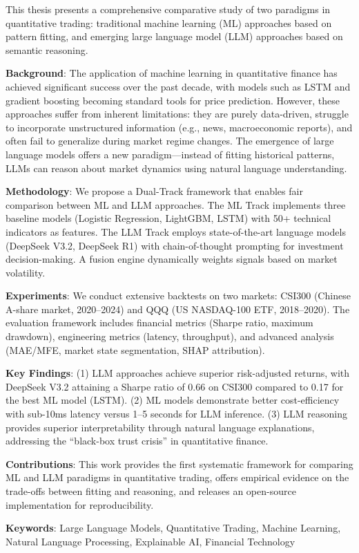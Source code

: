 
This thesis presents a comprehensive comparative study of two paradigms in quantitative trading: traditional machine learning (ML) approaches based on pattern fitting, and emerging large language model (LLM) approaches based on semantic reasoning.

\textbf{Background}: The application of machine learning in quantitative finance has achieved significant success over the past decade, with models such as LSTM and gradient boosting becoming standard tools for price prediction. However, these approaches suffer from inherent limitations: they are purely data-driven, struggle to incorporate unstructured information (e.g., news, macroeconomic reports), and often fail to generalize during market regime changes. The emergence of large language models offers a new paradigm---instead of fitting historical patterns, LLMs can reason about market dynamics using natural language understanding.

\textbf{Methodology}: We propose a Dual-Track framework that enables fair comparison between ML and LLM approaches. The ML Track implements three baseline models (Logistic Regression, LightGBM, LSTM) with 50+ technical indicators as features. The LLM Track employs state-of-the-art language models (DeepSeek V3.2, DeepSeek R1) with chain-of-thought prompting for investment decision-making. A fusion engine dynamically weights signals based on market volatility.

\textbf{Experiments}: We conduct extensive backtests on two markets: CSI300 (Chinese A-share market, 2020--2024) and QQQ (US NASDAQ-100 ETF, 2018--2020). The evaluation framework includes financial metrics (Sharpe ratio, maximum drawdown), engineering metrics (latency, throughput), and advanced analysis (MAE/MFE, market state segmentation, SHAP attribution).

\textbf{Key Findings}: (1) LLM approaches achieve superior risk-adjusted returns, with DeepSeek V3.2 attaining a Sharpe ratio of 0.66 on CSI300 compared to 0.17 for the best ML model (LSTM). (2) ML models demonstrate better cost-efficiency with sub-10ms latency versus 1--5 seconds for LLM inference. (3) LLM reasoning provides superior interpretability through natural language explanations, addressing the ``black-box trust crisis'' in quantitative finance.

\textbf{Contributions}: This work provides the first systematic framework for comparing ML and LLM paradigms in quantitative trading, offers empirical evidence on the trade-offs between fitting and reasoning, and releases an open-source implementation for reproducibility.

\vspace{1em}
\noindent\textbf{Keywords}: Large Language Models, Quantitative Trading, Machine Learning, Natural Language Processing, Explainable AI, Financial Technology